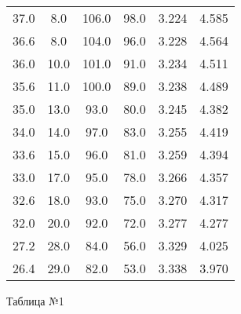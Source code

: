 \documentclass[12pt,a4paper]{article}
\begin{document}
\begin{center}
\begin{tabular}{| c  c  c  |  c  c  c |}
37.0&8.0&106.0&98.0&3.224&4.585\\ 
36.6&8.0&104.0&96.0&3.228&4.564\\ 
36.0&10.0&101.0&91.0&3.234&4.511\\ 
35.6&11.0&100.0&89.0&3.238&4.489\\ 
35.0&13.0&93.0&80.0&3.245&4.382\\ 
34.0&14.0&97.0&83.0&3.255&4.419\\ 
33.6&15.0&96.0&81.0&3.259&4.394\\ 
33.0&17.0&95.0&78.0&3.266&4.357\\ 
32.6&18.0&93.0&75.0&3.270&4.317\\ 
32.0&20.0&92.0&72.0&3.277&4.277\\ 
27.2&28.0&84.0&56.0&3.329&4.025\\ 
26.4&29.0&82.0&53.0&3.338&3.970\\ 
\hline
\end{tabular} 

Таблица №1
\end{center}
\end{document}
